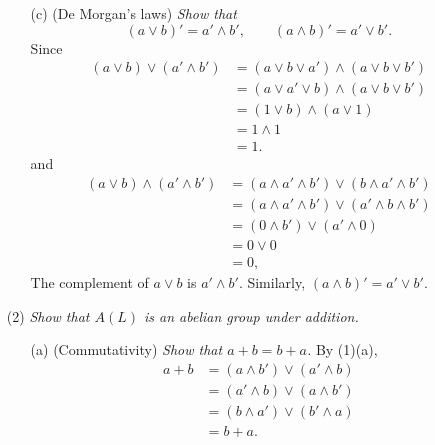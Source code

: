 \documentclass{article}
\begin{document}
\begin{enumerate}
\begin{enumerate}
  \item[(c)]
    (De Morgan's laws)
    \emph{Show that}
    \[
      (a \vee b)' = a' \wedge b',
      \qquad
      (a \wedge b)' = a' \vee b'.
    \]
    Since
    \begin{align*}
      (a \vee b) \vee (a' \wedge b')
      &= (a \vee b \vee a') \wedge (a \vee b \vee b') \\
      &= (a \vee a' \vee b) \wedge (a \vee b \vee b') \\
      &= (1 \vee b) \wedge (a \vee 1) \\
      &= 1 \wedge 1 \\
      &= 1.
    \end{align*}
    and
    \begin{align*}
      (a \vee b) \wedge (a' \wedge b')
      &= (a \wedge a' \wedge b') \vee (b \wedge a' \wedge b') \\
      &= (a \wedge a' \wedge b') \vee (a' \wedge b \wedge b') \\
      &= (0 \wedge b') \vee (a' \wedge 0) \\
      &= 0 \vee 0 \\
      &= 0,
    \end{align*}
    The complement of $a \vee b$ is $a' \wedge b'$.
    Similarly, $(a \wedge b)' = a' \vee b'$.
  \end{enumerate}

\item[(2)]
  \emph{Show that $A(L)$ is an abelian group under addition.}
  \begin{enumerate}
  \item[(a)]
    (Commutativity)
    \emph{Show that $a + b = b + a$.}
    By (1)(a),
    \begin{align*}
      a + b
      &= (a \wedge b') \vee (a' \wedge b) \\
      &= (a' \wedge b) \vee (a \wedge b') \\
      &= (b \wedge a') \vee (b' \wedge a) \\
      &= b + a.
    \end{align*}


\end{enumerate}
\end{enumerate}
\end{document}
